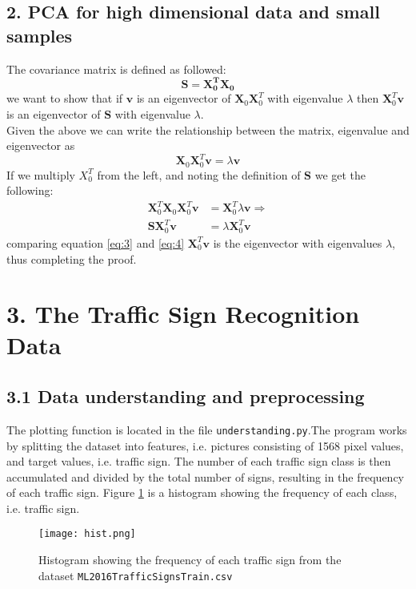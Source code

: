 \documentclass{article}
\begin{document}
\subsection{2. PCA for high dimensional data and small
samples}
The covariance matrix is defined as followed:
\begin{equation}
\mathbf{S} = \mathbf{X_0^T} \mathbf{X_0}
\end{equation}
we want to show that if $\mathbf{v}$ is an eigenvector of $ \mathbf{X}_0 \mathbf{X}_0^T$ with eigenvalue $\lambda$ then $\mathbf{X}_0^T\mathbf{v}$ is an eigenvector of $\mathbf{S}$ with eigenvalue $\lambda$. \\
Given the above we can write the relationship between the matrix, eigenvalue and eigenvector as
\begin{equation}
\mathbf{X}_0 \mathbf{X}_0^T \mathbf{v} = \lambda \mathbf{v}
\label{eq:3}
\end{equation}
If we multiply $X_0^T$ from the left, and noting the definition of $\mathbf{S}$ we get the following:
\begin{align}
\mathbf{X}_0^T \mathbf{X}_0 \mathbf{X}_0^T \mathbf{v} &= \mathbf{X}_0^T \lambda \mathbf{v} \Rightarrow \\
\mathbf{S} \mathbf{X}_0^T \mathbf{v} &= \lambda \mathbf{X}_0^T  \mathbf{v}
\label{eq:4}
\end{align}
comparing equation \ref{eq:3} and \ref{eq:4} $\mathbf{X}_0^T \mathbf{v}$ is the eigenvector with eigenvalues $\lambda$, thus completing the proof.
\section{3. The Traffic Sign Recognition Data}
\subsection{3.1 Data understanding and preprocessing}
The plotting function is located in the file \texttt{understanding.py}.The program works by splitting the dataset into features, i.e. pictures consisting of 1568 pixel values, and target values, i.e. traffic sign. The number of each traffic sign class is then accumulated and divided by the total number of signs, resulting in the frequency of each traffic sign. Figure \ref{fig:hist} is a histogram showing the frequency of each class, i.e. traffic sign.
\begin{figure}[H]
  \centering
  \texttt{[image: hist.png]}
  \caption{Histogram showing the frequency of each traffic sign from the dataset \texttt{ML2016TrafficSignsTrain.csv}}
  \label{fig:hist}
\end{figure}
\end{document}
